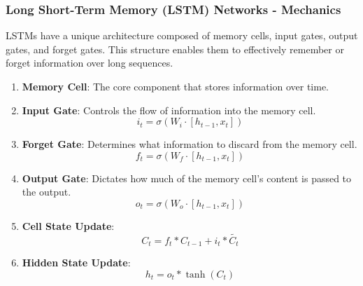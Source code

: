\documentclass{beamer}
\begin{document}
\begin{frame}[fragile]
    \frametitle{Long Short-Term Memory (LSTM) Networks - Mechanics}
    LSTMs have a unique architecture composed of memory cells, input gates, output gates, and forget gates. This structure enables them to effectively remember or forget information over long sequences.

    \begin{enumerate}
        \item \textbf{Memory Cell}: The core component that stores information over time.
        \item \textbf{Input Gate}: Controls the flow of information into the memory cell.
              \begin{equation}
                  i_t = \sigma(W_i \cdot [h_{t-1}, x_t])
              \end{equation}
        \item \textbf{Forget Gate}: Determines what information to discard from the memory cell.
              \begin{equation}
                  f_t = \sigma(W_f \cdot [h_{t-1}, x_t])
              \end{equation}
        \item \textbf{Output Gate}: Dictates how much of the memory cell's content is passed to the output.
              \begin{equation}
                  o_t = \sigma(W_o \cdot [h_{t-1}, x_t])
              \end{equation}
        \item \textbf{Cell State Update}:
              \begin{equation}
                  C_t = f_t * C_{t-1} + i_t * \tilde{C_t}
              \end{equation}
        \item \textbf{Hidden State Update}:
              \begin{equation}
                  h_t = o_t * \tanh(C_t)
              \end{equation}
    \end{enumerate}
\end{frame}
\end{document}
